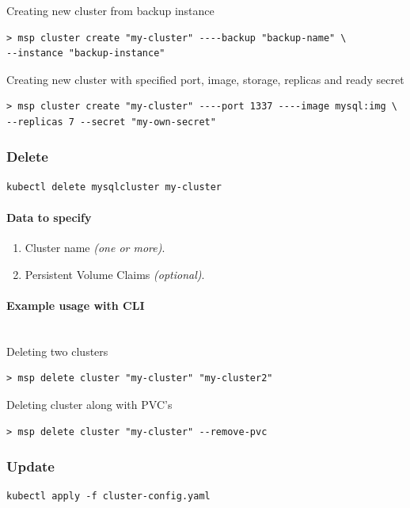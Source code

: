 \noindent Creating new cluster from backup instance

\begin{lstlisting}
> msp cluster create "my-cluster" ----backup "backup-name" \
--instance "backup-instance"
\end{lstlisting}

\noindent Creating new cluster with specified port, image, storage, replicas and ready secret

\begin{lstlisting}
> msp cluster create "my-cluster" ----port 1337 ----image mysql:img \
--replicas 7 --secret "my-own-secret"
\end{lstlisting}

\subsubsection*{Delete}
\begin{lstlisting}
kubectl delete mysqlcluster my-cluster

\end{lstlisting}


\paragraph{Data to specify}
\begin{enumerate}
	\item Cluster name \textit{(one or more)}.
	\item Persistent Volume Claims \textit{(optional)}.
\end{enumerate}

\paragraph{Example usage with CLI}\mbox{}\\

\noindent Deleting two clusters

\begin{lstlisting}
> msp delete cluster "my-cluster" "my-cluster2"
\end{lstlisting}

\noindent Deleting cluster along with PVC’s

\begin{lstlisting}
> msp delete cluster "my-cluster" --remove-pvc
\end{lstlisting}

\subsubsection*{Update}
\begin{lstlisting}
kubectl apply -f cluster-config.yaml
\end{lstlisting}

